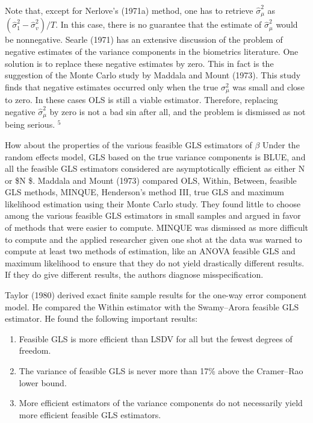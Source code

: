 \documentclass[
]{book}
\providecommand{\tightlist}{%
  \setlength{\itemsep}{0pt}\setlength{\parskip}{0pt}}
\begin{document}
Note that, except for Nerlove's (1971a) method, one has to retrieve \(\widehat{\sigma}_{\mu}^{2}\) as \(\left(\widehat{\sigma}_{1}^{2}-\widehat{\sigma}_{v}^{2}\right) / T .\) In this case, there is no guarantee that the estimate of \(\widehat{\sigma}_{\mu}^{2}\) would be nonnegative. Searle (1971) has an extensive discussion of the problem of negative estimates of the variance components in the biometrics literature. One solution is to replace these negative estimates by zero. This in fact is the suggestion of the Monte Carlo study by Maddala and Mount (1973). This study finds that negative estimates occurred only when the true \(\sigma_{\mu}^{2}\) was small and close to zero. In these cases OLS is still a viable estimator. Therefore, replacing negative \(\widehat{\sigma}_{\mu}^{2}\) by zero is not a bad sin after all, and the problem is dismissed as not being serious. \({ }^{5}\)

How about the properties of the various feasible GLS estimators of \(\beta\) Under the random effects model, GLS based on the true variance components is BLUE, and all the feasible GLS estimators considered are asymptotically efficient as either N or \$N \rightarrow \infty \$. Maddala and Mount (1973) compared OLS, Within, Between, feasible GLS methods, MINQUE, Henderson's method III, true GLS and maximum likelihood estimation using their Monte Carlo study. They found little to choose among the various feasible GLS estimators in small samples and argued in favor of methods that were easier to compute. MINQUE was dismissed as more difficult to compute and the applied researcher given one shot at the data was warned to compute at least two methods of estimation, like an ANOVA feasible GLS and maximum likelihood to ensure that they do not yield drastically different results. If they do give different results, the authors diagnose misspecification.

Taylor (1980) derived exact finite sample results for the one-way error component model. He compared the Within estimator with the Swamy--Arora feasible GLS estimator. He found the following important results:

\begin{enumerate}
\def\labelenumi{(\arabic{enumi})}
\tightlist
\item
  Feasible GLS is more efficient than LSDV for all but the fewest degrees of freedom.
\item
  The variance of feasible GLS is never more than 17\% above the Cramer--Rao lower bound.
\item
  More efficient estimators of the variance components do not necessarily yield more efficient feasible GLS estimators.
\end{enumerate}
\end{document}
